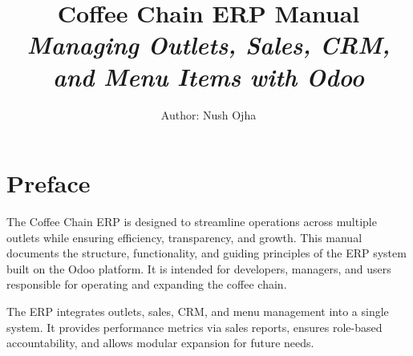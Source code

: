 \documentclass[12pt]{report}
\title{
    \textbf{\Huge Coffee Chain ERP Manual} \\
    \Large \textit{Managing Outlets, Sales, CRM, and Menu Items with Odoo}
}
\author{
    \large Author: Nush Ojha
}
\date{}
\begin{document}
\maketitle

\newpage

\chapter*{Preface}

The Coffee Chain ERP is designed to streamline operations across multiple outlets while ensuring efficiency, transparency, and growth. This manual documents the structure, functionality, and guiding principles of the ERP system built on the Odoo platform. It is intended for developers, managers, and users responsible for operating and expanding the coffee chain.

The ERP integrates outlets, sales, CRM, and menu management into a single system. It provides performance metrics via sales reports, ensures role-based accountability, and allows modular expansion for future needs.

\tableofcontents
\clearpage













\end{document}
